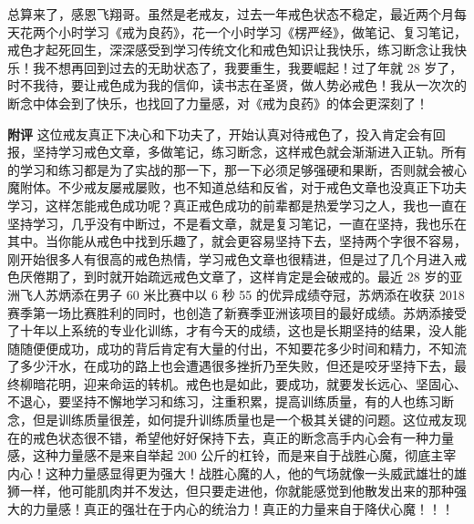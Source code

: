 \begin{case}
    总算来了，感恩飞翔哥。虽然是老戒友，过去一年戒色状态不稳定，最近两个月每天花两个小时学习《戒为良药》，花一个小时学习《楞严经》，做笔记、复习笔记，戒色才起死回生，深深感受到学习传统文化和戒色知识让我快乐，练习断念让我快乐！我不想再回到过去的无助状态了，我要重生，我要崛起！过了年就 28 岁了，时不我待，要让戒色成为我的信仰，读书志在圣贤，做人势必戒色！我从一次次的断念中体会到了快乐，也找回了力量感，对《戒为良药》的体会更深刻了！

    \textbf{附评} 这位戒友真正下决心和下功夫了，开始认真对待戒色了，投入肯定会有回报，坚持学习戒色文章，多做笔记，练习断念，这样戒色就会渐渐进入正轨。所有的学习和练习都是为了实战的那一下，那一下必须足够强硬和果断，否则就会被心魔附体。不少戒友屡戒屡败，也不知道总结和反省，对于戒色文章也没真正下功夫学习，这样怎能戒色成功呢？真正戒色成功的前辈都是热爱学习之人，我也一直在坚持学习，几乎没有中断过，不是看文章，就是复习笔记，一直在坚持，我也乐在其中。当你能从戒色中找到乐趣了，就会更容易坚持下去，坚持两个字很不容易，刚开始很多人有很高的戒色热情，学习戒色文章也很精进，但是过了几个月进入戒色厌倦期了，到时就开始疏远戒色文章了，这样肯定是会破戒的。最近 28 岁的亚洲飞人苏炳添在男子 60 米比赛中以 6 秒 55 的优异成绩夺冠，苏炳添在收获 2018 赛季第一场比赛胜利的同时，也创造了新赛季亚洲该项目的最好成绩。苏炳添接受了十年以上系统的专业化训练，才有今天的成绩，这也是长期坚持的结果，没人能随随便便成功，成功的背后肯定有大量的付出，不知要花多少时间和精力，不知流了多少汗水，在成功的路上也会遭遇很多挫折乃至失败，但还是咬牙坚持下去，最终柳暗花明，迎来命运的转机。戒色也是如此，要成功，就要发长远心、坚固心、不退心，要坚持不懈地学习和练习，注重积累，提高训练质量，有的人也练习断念，但是训练质量很差，如何提升训练质量也是一个极其关键的问题。这位戒友现在的戒色状态很不错，希望他好好保持下去，真正的断念高手内心会有一种力量感，这种力量感不是来自举起 200 公斤的杠铃，而是来自于战胜心魔，彻底主宰内心！这种力量感显得更为强大！战胜心魔的人，他的气场就像一头威武雄壮的雄狮一样，他可能肌肉并不发达，但只要走进他，你就能感觉到他散发出来的那种强大的力量感！真正的强壮在于内心的统治力！真正的力量来自于降伏心魔！！！
\end{case}


